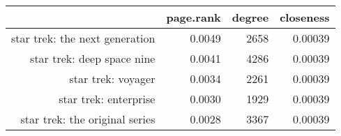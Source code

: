 \begin{table}[ht]
\centering
\begin{tabular}{rrrr}
  \hline
 & page.rank & degree & closeness \\ 
  \hline
star trek: the next generation & 0.0049 & 2658 & 0.00039 \\ 
  star trek: deep space nine & 0.0041 & 4286 & 0.00039 \\ 
  star trek: voyager & 0.0034 & 2261 & 0.00039 \\ 
  star trek: enterprise & 0.0030 & 1929 & 0.00039 \\ 
  star trek: the original series & 0.0028 & 3367 & 0.00039 \\ 
   \hline
\end{tabular}
\end{table}
